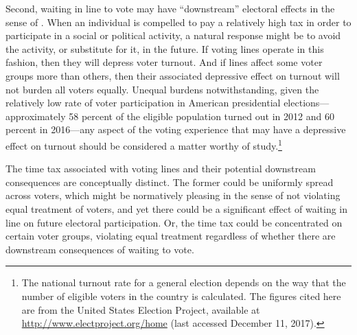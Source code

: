 \documentclass[12pt,titlepage]{article}
\begin{document}
Second, waiting in line to vote may have ``downstream'' electoral
effects in the sense of
\citet{pettigrew:longlinesminorityprecincts}. When an individual is
compelled to pay a relatively high tax in order to participate in a
social or political activity, a natural response might be to avoid the
activity, or substitute for it, in the future.  If voting lines
operate in this fashion, then they will depress voter turnout.  And if
lines affect some voter groups more than others, then their associated
depressive effect on turnout will not burden all voters equally.
Unequal burdens notwithstanding, given the relatively low rate of
voter participation in American presidential elections---approximately
58 percent of the eligible population turned out in 2012 and 60
percent in 2016---any aspect of the voting experience that may have
a depressive effect on turnout should be considered a matter worthy of
study.\footnote{The national turnout rate for a general election
  depends on the way that the number of eligible voters in the country
  is calculated.  The figures cited here are from the United States
  Election Project, available at
  \url{http://www.electproject.org/home} (last accessed December 11,
  2017).\label{fn:uselectionproject}}



The time tax associated with voting lines and their potential
downstream consequences are conceptually distinct. The former could be
uniformly spread across voters, which might be normatively pleasing in
the sense of not violating equal treatment of voters, and yet there
could be a significant effect of waiting in line on future electoral
participation. Or, the time tax could be concentrated on certain voter
groups, violating equal treatment regardless of whether there are
downstream consequences of waiting to vote.
\end{document}
